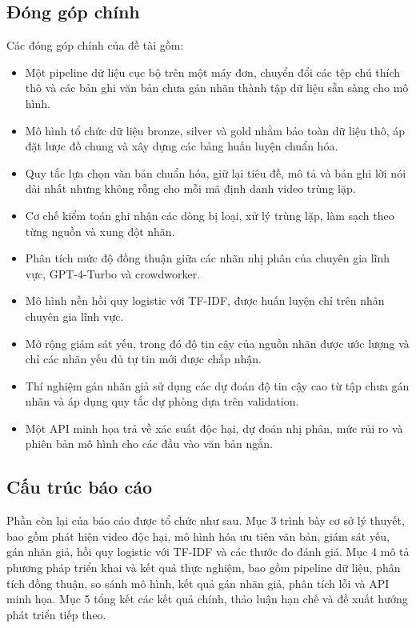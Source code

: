 \subsection{Đóng góp chính}

Các đóng góp chính của đề tài gồm:

\begin{itemize}
    \item Một pipeline dữ liệu cục bộ trên một máy đơn, chuyển đổi các tệp chú thích thô và các bản ghi văn bản chưa gán nhãn thành tập dữ liệu sẵn sàng cho mô hình.
    \item Mô hình tổ chức dữ liệu bronze, silver và gold nhằm bảo toàn dữ liệu thô, áp đặt lược đồ chung và xây dựng các bảng huấn luyện chuẩn hóa.
    \item Quy tắc lựa chọn văn bản chuẩn hóa, giữ lại tiêu đề, mô tả và bản ghi lời nói dài nhất nhưng không rỗng cho mỗi mã định danh video trùng lặp.
    \item Cơ chế kiểm toán ghi nhận các dòng bị loại, xử lý trùng lặp, làm sạch theo từng nguồn và xung đột nhãn.
    \item Phân tích mức độ đồng thuận giữa các nhãn nhị phân của chuyên gia lĩnh vực, GPT-4-Turbo và crowdworker.
    \item Mô hình nền hồi quy logistic với TF-IDF, được huấn luyện chỉ trên nhãn chuyên gia lĩnh vực.
    \item Mở rộng giám sát yếu, trong đó độ tin cậy của nguồn nhãn được ước lượng và chỉ các nhãn yếu đủ tự tin mới được chấp nhận.
    \item Thí nghiệm gán nhãn giả sử dụng các dự đoán độ tin cậy cao từ tập chưa gán nhãn và áp dụng quy tắc dự phòng dựa trên validation.
    \item Một API minh họa trả về xác suất độc hại, dự đoán nhị phân, mức rủi ro và phiên bản mô hình cho các đầu vào văn bản ngắn.
\end{itemize}

\subsection{Cấu trúc báo cáo}

Phần còn lại của báo cáo được tổ chức như sau. Mục 3 trình bày cơ sở lý thuyết, bao gồm phát hiện video độc hại, mô hình hóa ưu tiên văn bản, giám sát yếu, gán nhãn giả, hồi quy logistic với TF-IDF và các thước đo đánh giá. Mục 4 mô tả phương pháp triển khai và kết quả thực nghiệm, bao gồm pipeline dữ liệu, phân tích đồng thuận, so sánh mô hình, kết quả gán nhãn giả, phân tích lỗi và API minh họa. Mục 5 tổng kết các kết quả chính, thảo luận hạn chế và đề xuất hướng phát triển tiếp theo.
